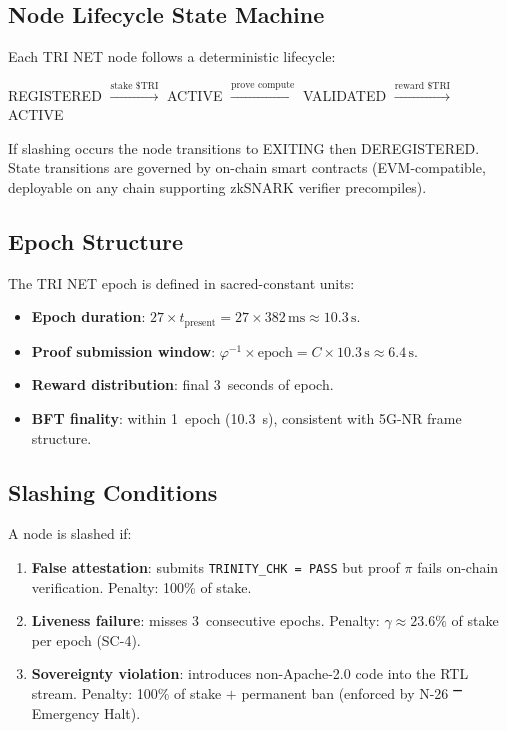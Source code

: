 \subsection{Node Lifecycle State Machine}

Each TRI NET node follows a deterministic lifecycle:
\begin{center}
REGISTERED \(\xrightarrow{\text{stake \$TRI}}\) ACTIVE
\(\xrightarrow{\text{prove compute}}\) VALIDATED
\(\xrightarrow{\text{reward \$TRI}}\) ACTIVE
\end{center}
If slashing occurs the node transitions to EXITING then DEREGISTERED.
State transitions are governed by on-chain smart contracts (EVM-compatible,
deployable on any chain supporting zkSNARK verifier precompiles).

\subsection{Epoch Structure}

The TRI NET epoch is defined in sacred-constant units:
\begin{itemize}
  \item \textbf{Epoch duration}: \(27 \times t_{\text{present}} = 27 \times
        382\,\text{ms} \approx 10.3\,\text{s}\).
  \item \textbf{Proof submission window}: \(\varphi^{-1} \times \text{epoch}
        = C \times 10.3\,\text{s} \approx 6.4\,\text{s}\).
  \item \textbf{Reward distribution}: final 3~seconds of epoch.
  \item \textbf{BFT finality}: within 1~epoch (10.3~s), consistent with 5G-NR
        frame structure.
\end{itemize}

\subsection{Slashing Conditions}

A node is slashed if:
\begin{enumerate}
  \item \textbf{False attestation}: submits \texttt{TRINITY\_CHK = PASS} but
        proof \(\pi\) fails on-chain verification. Penalty: 100\% of stake.
  \item \textbf{Liveness failure}: misses 3~consecutive epochs. Penalty:
        \(\gamma \approx 23.6\%\) of stake per epoch (SC-4).
  \item \textbf{Sovereignty violation}: introduces non-Apache-2.0 code into
        the RTL stream. Penalty: 100\% of stake \(+\) permanent ban (enforced
        by N-26 Ⲻ Emergency Halt).
\end{enumerate}

